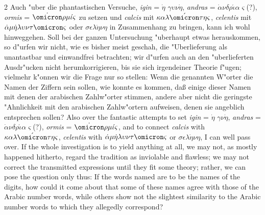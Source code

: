 \documentclass[10pt,a4paper]{article}
\renewcommand{\switchcolumn}{\syncronize\nointerlineskip\columnbreak}
\begin{document}
\begin{paracol}{2}
Auch "uber die phantastischen Versuche, \textit{igin} = $\dot{\eta}$ $\gamma\upsilon\nu\dot{\eta}$, \textit{andras} = $\dot{\alpha}\nu\delta\rho\acute{\iota}\alpha\varsigma$(?), \textit{ormis} = $\dot{\omicron}\rho\mu\acute{\iota}\varsigma$ zu setzen und \textit{calcis} mit $\kappa\alpha\lambda\acute{\omicron}\tau\eta\varsigma$, \textit{celentis} mit $\dot{\alpha}\mu\dot{\eta}\lambda\upsilon\nu\tau\omicron\varsigma$ oder $\sigma\epsilon\lambda\dot{\eta}\nu\eta$ in Zusammenhang zu bringen, kann ich wohl hinweggehen. Soll bei der ganzen Untersuchung "uberhaupt etwas herauskommen, so d"urfen wir nicht, wie es bisher meist geschah, die "Uberlieferung als unantastbar und einwandfrei betrachten; wir d"urfen auch an den "uberlieferten Ausdr"ucken nicht herumkorrigieren, bis sie sich irgendeiner Theorie f"ugen; vielmehr k"onnen wir die Frage nur so stellen: Wenn die genannten W"orter die Namen der Ziffern sein sollen, wie konnte es kommen, da\ss{} einige dieser Namen mit denen der arabischen Zahlw"orter stimmen, andere aber nicht die geringste "Ahnlichkeit mit den arabischen Zahlw"ortern aufweisen, denen sie angeblich entsprechen sollen?
\switchcolumn
Also over the fantastic attempts to set \textit{igin} = $\dot{\eta}$ $\gamma\nu\dot{\eta}$, \textit{andras} = $\dot{\alpha}\nu\delta\rho\acute{\iota}\alpha\varsigma$(?), \textit{ormis} = $\dot{\omicron}\rho\mu\acute{\iota}\varsigma$, and to connect \textit{calcis} with $\kappa\alpha\lambda\acute{\omicron}\tau\eta\varsigma$, \textit{celentis} with $\dot{\alpha}\mu\dot{\eta}\lambda\upsilon\nu\tau\omicron\varsigma$ or $\sigma\epsilon\lambda\dot{\eta}\nu\eta$, I can well pass over. If the whole investigation is to yield anything at all, we may not, as mostly happened hitherto, regard the tradition as inviolable and flawless; we may not correct the transmitted expressions until they fit some theory; rather, we can pose the question only thus: If the words named are to be the names of the digits, how could it come about that some of these names agree with those of the Arabic number words, while others show not the slightest similarity to the Arabic number words to which they allegedly correspond?
\end{paracol}
\end{document}
